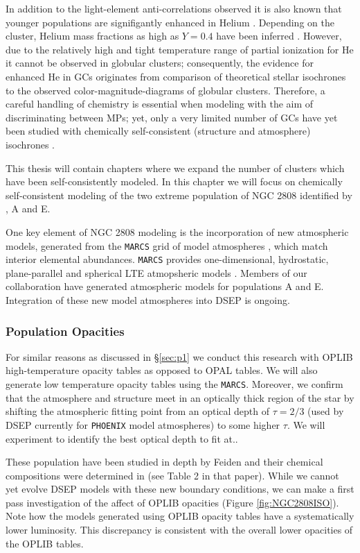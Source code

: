 In addition to the light-element anti-correlations observed it is also known
that younger populations are signifigantly enhanced in Helium
\citep{Piotto2007, Piotto2015, Latour2019}. Depending on the cluster, Helium
mass fractions as high as $Y=0.4$ have been inferred \citep[e.g][]{Milone2015}.
However, due to the relatively high and tight temperature range of partial
ionization for He it cannot be observed in globular clusters; consequently, the
evidence for enhanced He in GCs originates from comparison of theoretical
stellar isochrones to the observed color-magnitude-diagrams of globular
clusters. Therefore, a careful handling of chemistry is essential when modeling
with the aim of discriminating between MPs; yet, only a very limited number of
GCs have yet been studied with chemically self-consistent (structure and
atmosphere) isochrones \citep[e.g.][NGC 6752]{Dotter2015}.

This thesis will contain chapters where we expand the number of clusters which
have been self-consistently modeled. In this chapter we will focus on
chemically self-consistent modeling of the two extreme population of NGC 2808
identified by \citep{Milone2015}, A and E.

One key element of NGC 2808 modeling is the incorporation of new atmospheric
models, generated from the \texttt{MARCS} grid of model atmospheres \citep{Plez2008},
which match interior elemental abundances. \texttt{MARCS} provides one-dimensional,
hydrostatic, plane-parallel and spherical LTE atmopsheric models
\citep{Gustafsson2008}. Members of our collaboration have generated atmospheric 
models for populations A and E.  Integration of these new model atmospheres
into DSEP is ongoing. 

\subsubsection{Population Opacities}
For similar reasons as discussed in \S\ref{sec:p1} we conduct this research
with OPLIB high-temperature opacity tables as opposed to OPAL tables. We will
also generate low temperature opacity tables using the \texttt{MARCS}.
Moreover, we confirm that the atmosphere and structure meet in an optically
thick region of the star by shifting the atmospheric fitting point from an optical
depth of $\tau = 2/3$ (used by DSEP currently for \texttt{PHOENIX} model atmospheres) to
some higher $\tau$. We will experiment to identify the best optical depth to
fit at.. 

These population have been studied in depth by Feiden and their chemical
compositions were determined in \citet{Milone2015} (see Table 2 in that paper).
While we cannot yet evolve DSEP models with these new boundary conditions, we
can make a first pass investigation of the affect of OPLIB opacities (Figure
\ref{fig:NGC2808ISO}). Note how the models generated using OPLIB opacity tables
have a systematically lower luminosity. This discrepancy is consistent with
the overall lower opacities of the OPLIB tables. 


